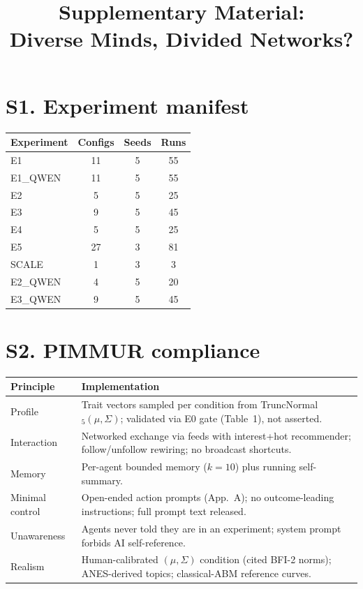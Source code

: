 \documentclass[11pt]{article}
\title{Supplementary Material:\\Diverse Minds, Divided Networks?}
\begin{document}
\maketitle

\section{S1. Experiment manifest}
\begin{tabular}{lccc}\toprule
Experiment & Configs & Seeds & Runs \\ \midrule
E1 & 11 & 5 & 55 \\
E1_QWEN & 11 & 5 & 55 \\
E2 & 5 & 5 & 25 \\
E3 & 9 & 5 & 45 \\
E4 & 5 & 5 & 25 \\
E5 & 27 & 3 & 81 \\
SCALE & 1 & 3 & 3 \\
E2_QWEN & 4 & 5 & 20 \\
E3_QWEN & 9 & 5 & 45 \\
\bottomrule\end{tabular}

\section{S2. PIMMUR compliance}
\begin{tabular}{p{2.6cm}p{11cm}}\toprule
Principle & Implementation \\ \midrule
Profile & Trait vectors sampled per condition from TruncNormal$_5(\mu,\Sigma)$; validated via E0 gate (Table~1), not asserted. \\
Interaction & Networked exchange via feeds with interest+hot recommender; follow/unfollow rewiring; no broadcast shortcuts. \\
Memory & Per-agent bounded memory ($k{=}10$) plus running self-summary. \\
Minimal control & Open-ended action prompts (App.~A); no outcome-leading instructions; full prompt text released. \\
Unawareness & Agents never told they are in an experiment; system prompt forbids AI self-reference. \\
Realism & Human-calibrated $(\mu,\Sigma)$ condition (cited BFI-2 norms); ANES-derived topics; classical-ABM reference curves. \\
\bottomrule\end{tabular}
\end{document}
